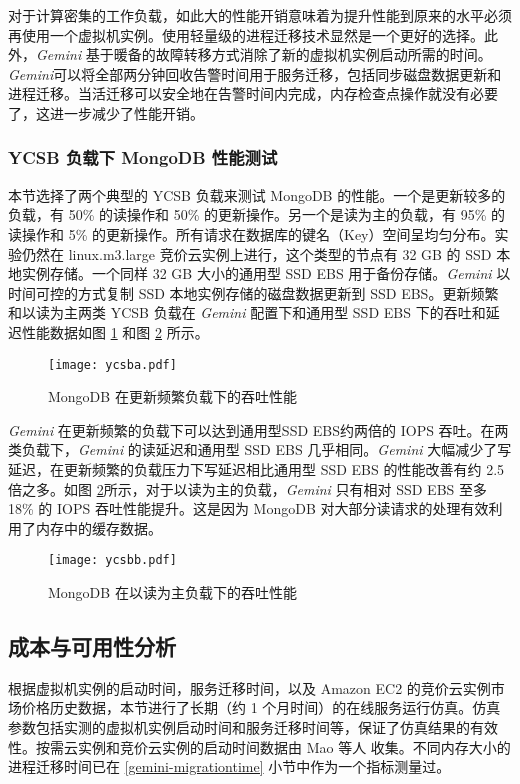 对于计算密集的工作负载，如此大的性能开销意味着为提升性能到原来的水平必须再使用一个虚拟机实例。使用轻量级的进程迁移技术显然是一个更好的选择。此外，\emph{Gemini} 基于暖备的故障转移方式消除了新的虚拟机实例启动所需的时间。\emph{Gemini}可以将全部两分钟回收告警时间用于服务迁移，包括同步磁盘数据更新和进程迁移。当活迁移可以安全地在告警时间内完成，内存检查点操作就没有必要了，这进一步减少了性能开销。

\subsubsection{YCSB 负载下 MongoDB 性能测试}
本节选择了两个典型的 YCSB 负载来测试 MongoDB 的性能。一个是更新较多的负载，有 50\% 的读操作和 50\% 的更新操作。另一个是读为主的负载，有 95\% 的读操作和 5\% 的更新操作。所有请求在数据库的键名（Key）空间呈均匀分布。实验仍然在 linux.m3.large 竞价云实例上进行，这个类型的节点有 32 GB 的 SSD 本地实例存储。一个同样 32 GB 大小的通用型 SSD EBS 用于备份存储。\emph{Gemini} 以时间可控的方式复制 SSD 本地实例存储的磁盘数据更新到 SSD EBS。更新频繁和以读为主两类 YCSB 负载在 \emph{Gemini} 配置下和通用型 SSD EBS 下的吞吐和延迟性能数据如图 \ref{figure:ycsba} 和图 \ref{figure:ycsbb} 所示。
\begin{figure}[]
  \centering
  \texttt{[image: ycsba.pdf]}
  \caption{MongoDB 在更新频繁负载下的吞吐性能}
  \label{figure:ycsba}
\end{figure}

\emph{Gemini} 在更新频繁的负载下可以达到通用型SSD EBS约两倍的 IOPS 吞吐。在两类负载下，\emph{Gemini} 的读延迟和通用型 SSD EBS 几乎相同。\emph{Gemini} 大幅减少了写延迟，在更新频繁的负载压力下写延迟相比通用型 SSD EBS 的性能改善有约 2.5 倍之多。如图 \ref{figure:ycsbb}所示，对于以读为主的负载，\emph{Gemini} 只有相对 SSD EBS 至多 18\% 的 IOPS 吞吐性能提升。这是因为 MongoDB 对大部分读请求的处理有效利用了内存中的缓存数据。
\begin{figure}[]
  \centering
  \texttt{[image: ycsbb.pdf]}
  \caption{MongoDB 在以读为主负载下的吞吐性能}
  \label{figure:ycsbb}
\end{figure}

\subsection{成本与可用性分析}
根据虚拟机实例的启动时间，服务迁移时间，以及 Amazon EC2 的竞价云实例市场价格历史数据，本节进行了长期（约 1 个月时间）的在线服务运行仿真。仿真参数包括实测的虚拟机实例启动时间和服务迁移时间等，保证了仿真结果的有效性。按需云实例和竞价云实例的启动时间数据由 Mao 等人 \cite{Mao:2012:PSV:2353730.2353859} 收集。不同内存大小的进程迁移时间已在 \ref{gemini-migrationtime} 小节中作为一个指标测量过。

